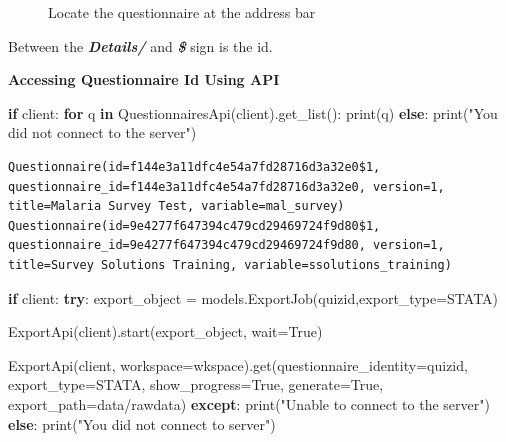 \documentclass[
  letterpaper,
  DIV=11,
  numbers=noendperiod]{scrreprt}
\newenvironment{Shaded}{\begin{snugshade}}{\end{snugshade}}
\newcommand{\BuiltInTok}[1]{\textcolor[rgb]{0.00,0.23,0.31}{#1}}
\newcommand{\ControlFlowTok}[1]{\textcolor[rgb]{0.00,0.23,0.31}{\textbf{#1}}}
\newcommand{\KeywordTok}[1]{\textcolor[rgb]{0.00,0.23,0.31}{\textbf{#1}}}
\newcommand{\NormalTok}[1]{\textcolor[rgb]{0.00,0.23,0.31}{#1}}
\newcommand{\OperatorTok}[1]{\textcolor[rgb]{0.37,0.37,0.37}{#1}}
\newcommand{\StringTok}[1]{\textcolor[rgb]{0.13,0.47,0.30}{#1}}
\newcommand{\VariableTok}[1]{\textcolor[rgb]{0.07,0.07,0.07}{#1}}
\begin{document}
\begin{enumerate}
\begin{figure}[H]
{  }

  \caption{Locate the questionnaire at the address bar}

  \end{figure}%
\end{enumerate}

Between the \textbf{\emph{Details/}} and \textbf{\emph{\$}} sign is the
id.

\textbf{Accessing Questionnaire Id Using API}

\begin{Shaded}
\begin{Highlighting}[]
\ControlFlowTok{if}\NormalTok{ client:}
  \ControlFlowTok{for}\NormalTok{ q }\KeywordTok{in}\NormalTok{ QuestionnairesApi(client).get\_list():}
      \BuiltInTok{print}\NormalTok{(q)}
\ControlFlowTok{else}\NormalTok{:}
  \BuiltInTok{print}\NormalTok{(}\StringTok{"You did not connect to the server"}\NormalTok{)}
\end{Highlighting}
\end{Shaded}

\begin{verbatim}
Questionnaire(id=f144e3a11dfc4e54a7fd28716d3a32e0$1, questionnaire_id=f144e3a11dfc4e54a7fd28716d3a32e0, version=1, title=Malaria Survey Test, variable=mal_survey)
Questionnaire(id=9e4277f647394c479cd29469724f9d80$1, questionnaire_id=9e4277f647394c479cd29469724f9d80, version=1, title=Survey Solutions Training, variable=ssolutions_training)
\end{verbatim}

\begin{Shaded}
\begin{Highlighting}[]
\ControlFlowTok{if}\NormalTok{ client:}
  \ControlFlowTok{try}\NormalTok{:}
\NormalTok{    export\_object }\OperatorTok{=}\NormalTok{ models.ExportJob(quizid,export\_type}\OperatorTok{=}\StringTok{\textquotesingle{}STATA\textquotesingle{}}\NormalTok{)}
  
\NormalTok{    ExportApi(client).start(export\_object, wait}\OperatorTok{=}\VariableTok{True}\NormalTok{)}
    
\NormalTok{    ExportApi(client, workspace}\OperatorTok{=}\NormalTok{wkspace).get(questionnaire\_identity}\OperatorTok{=}\NormalTok{quizid,}
\NormalTok{                          export\_type}\OperatorTok{=}\StringTok{\textquotesingle{}STATA\textquotesingle{}}\NormalTok{,}
\NormalTok{                          show\_progress}\OperatorTok{=}\VariableTok{True}\NormalTok{,}
\NormalTok{                          generate}\OperatorTok{=}\VariableTok{True}\NormalTok{,}
\NormalTok{                          export\_path}\OperatorTok{=}\StringTok{\textquotesingle{}data/rawdata\textquotesingle{}}\NormalTok{)}
  \ControlFlowTok{except}\NormalTok{:}
    \BuiltInTok{print}\NormalTok{(}\StringTok{"Unable to connect to the server"}\NormalTok{)}
\ControlFlowTok{else}\NormalTok{:}
  \BuiltInTok{print}\NormalTok{(}\StringTok{"You did not connect to server"}\NormalTok{)}
\end{Highlighting}
\end{Shaded}
\end{document}
